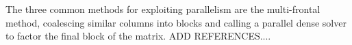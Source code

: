 \documentclass[acmtocl]{acmtrans2m}
\begin{document}


The three common methods for exploiting parallelism are the
multi-frontal method, coalescing  similar 
columns into blocks and calling a parallel dense solver 
to factor the final block of the matrix. ADD REFERENCES....

%


%
\end{document}
